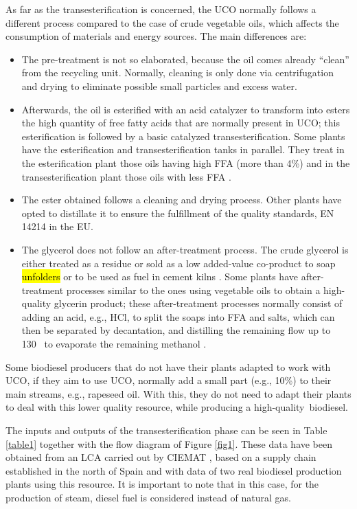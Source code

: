 \documentclass[sustainability,article,accept,moreauthors,pdftex,12pt,a4paper]{mdpi}
\newcommand{\degreeC}[1]{#1~\textcelsius}
\begin{document}
As far as the transesterification is concerned, the UCO normally follows a different process compared to the case of crude vegetable oils, which affects the consumption of materials and energy sources. The main differences are:
\begin{itemize}
\vspace{6pt}
\item The pre-treatment is not so elaborated, because the oil comes already ``clean'' from the recycling unit. Normally, cleaning is only done via centrifugation and drying to eliminate possible small particles and excess water.
\item Afterwards, the oil is esterified with an acid catalyzer to transform into esters the high quantity of free fatty acids that are normally present in UCO; this esterification is followed by a basic catalyzed transesterification. Some plants have the esterification and transesterification tanks in parallel. They treat in the esterification plant those oils having high FFA (more than 4\%) and in the transesterification plant those oils with less FFA \cite{CIEMAT2005}.
\item The ester obtained follows a cleaning and drying process. Other plants have opted to distillate it to ensure the fulfillment of the quality standards, EN 14214 \cite{CENEN14214} in the EU.
\item The glycerol does not follow an after-treatment process. The crude glycerol is either treated as a residue or sold as a low added-value co-product to soap \hl{unfolders} %
 or to be used as fuel in cement kilns \cite{FontdeMoraThesis2013}. Some plants have after-treatment processes similar to the ones using vegetable oils to obtain a high-quality glycerin product; these after-treatment processes normally consist of adding an acid, e.g., HCl, to split the soaps into FFA and salts, which can then be separated by decantation, and distilling the remaining flow up to \degreeC{130} to evaporate the remaining methanol \cite{FontdeMoraThesis2013}.
\vspace{6pt}
\end{itemize}

Some biodiesel producers that do not have their plants adapted to work with UCO, if they aim to use UCO, normally add a small part (e.g., 10\%) to their main streams, e.g., rapeseed oil. With this, they do not need to adapt their plants to deal with this lower quality resource, while producing a high-quality~biodiesel.

The inputs and outputs of the transesterification phase can be seen in Table \ref{table1} together with the flow diagram of Figure \ref{fig1}. These data have been obtained from an LCA carried out by CIEMAT \cite{CIEMAT2005}, based on a supply chain established in the north of Spain and with data of two real biodiesel production plants using this resource. It is important to note that in this case, for the production of steam, diesel fuel is considered instead of natural gas.
\end{document}
